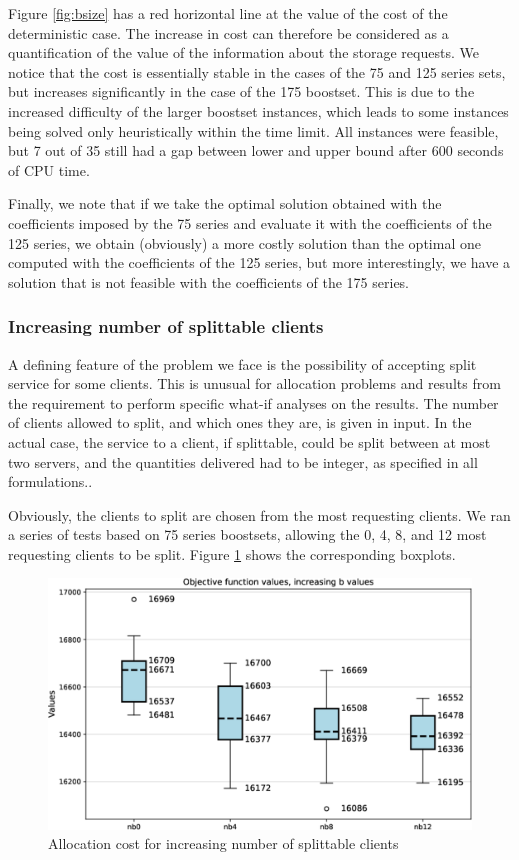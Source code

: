 \documentclass[ijoc,sglanonrev]{informs4}
\begin{document}
Figure \ref{fig:bsize} has a red horizontal line at the value of the cost of the deterministic case. The increase in cost can therefore be considered as a quantification of the value of the information about the storage requests. We notice that the cost is essentially stable in the cases of the 75 and 125 series sets, but increases significantly in the case of the 175 boostset. This is due to the increased difficulty of the larger boostset instances, which leads to some instances being solved only heuristically within the time limit. All instances were feasible, but 7 out of 35 still had a gap between lower and upper bound after 600 seconds of CPU time. 

Finally, we note that if we take the optimal solution obtained with the coefficients imposed by the 75 series and evaluate it with the coefficients of the 125 series, we obtain (obviously) a more costly solution than the optimal one computed with the coefficients of the 125 series, but more interestingly, we have a solution that is not feasible with the coefficients of the 175 series.

\subsubsection*{Increasing number of splittable clients}

A defining feature of the problem we face is the possibility of accepting split service for some clients. This is unusual for allocation problems and results from the requirement to perform specific what-if analyses on the results. The number of clients allowed to split, and which ones they are, is given in input. In the actual case, the service to a client, if splittable, could be split between at most two servers, and the quantities delivered had to be integer, as specified in all formulations..

Obviously, the clients to split are chosen from the most requesting clients. We ran a series of tests based on 75 series boostsets, allowing the 0, 4, 8, and 12 most requesting clients to be split. Figure \ref{fig:bmult} shows the corresponding boxplots.

\begin{figure}[ht] 
    \centering
    \includegraphics[width=0.7\linewidth]{figbmult.eps}%
    \caption{Allocation cost for increasing number of splittable clients}
    \label{fig:bmult}
\end{figure}
\end{document}
